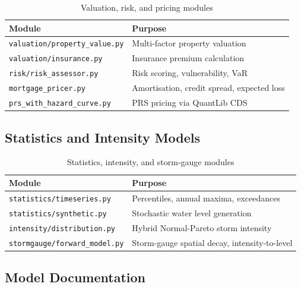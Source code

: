 \documentclass[11pt,a4paper]{article}
\begin{document}
\begin{table}[H]
    \centering
    \caption{Valuation, risk, and pricing modules}
    \begin{tabular}{@{}ll@{}}
        \toprule
        \textbf{Module} & \textbf{Purpose} \\
        \midrule
        \texttt{valuation/property\_value.py} & Multi-factor property valuation \\
        \texttt{valuation/insurance.py}        & Insurance premium calculation \\
        \texttt{risk/risk\_assessor.py}        & Risk scoring, vulnerability, VaR \\
        \texttt{mortgage\_pricer.py}           & Amortisation, credit spread, expected loss \\
        \texttt{prs\_with\_hazard\_curve.py}   & PRS pricing via QuantLib CDS \\
        \bottomrule
    \end{tabular}
\end{table}

\subsection{Statistics and Intensity Models}

\begin{table}[H]
    \centering
    \caption{Statistics, intensity, and storm-gauge modules}
    \begin{tabular}{@{}ll@{}}
        \toprule
        \textbf{Module} & \textbf{Purpose} \\
        \midrule
        \texttt{statistics/timeseries.py}     & Percentiles, annual maxima, exceedances \\
        \texttt{statistics/synthetic.py}       & Stochastic water level generation \\
        \texttt{intensity/distribution.py}     & Hybrid Normal-Pareto storm intensity \\
        \texttt{stormgauge/forward\_model.py}  & Storm-gauge spatial decay, intensity-to-level \\
        \bottomrule
    \end{tabular}
\end{table}

\subsection{Model Documentation}
\end{document}
